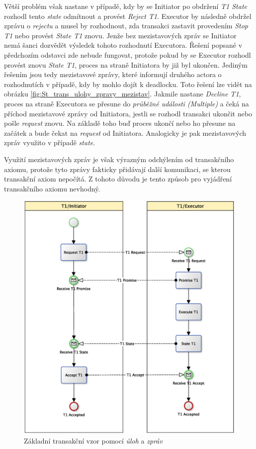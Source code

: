 Větší problém však nastane v případě, kdy by se Initiator po obdržení \textit{T1 State} rozhodl tento \textit{state} odmítnout a provést \textit{Reject T1}. Executor by následně obdržel zprávu o \textit{rejectu} a musel by rozhodnout, zda transakci zastavit provedením \textit{Stop T1} nebo provést \textit{State T1} znovu. Jenže bez mezistavových zpráv se Initiator nemá šanci dozvědět výsledek tohoto rozhodnutí Executora. Řešení popsané v předchozím odstavci zde nebude fungovat, protože pokud by se Executor rozhodl provést znovu \textit{State T1}, proces na straně Initiatora by již byl ukončen. Jediným řešením jsou tedy mezistavové zprávy, které informují druhého actora o rozhodnutích v případě, kdy by mohlo dojít k deadlocku. Toto řešení lze vidět na obrázku \ref{fig:St_trans_ulohy_zpravy_mezistav}. Jakmile nastane \textit{Decline T1}, proces na straně Executora se přesune do\textit{ průběžné události (Multiple)} a čeká na příchod mezistavové zprávy od Initiatora, jestli se rozhodl transakci ukončit nebo pošle \textit{request} znovu. Na základě toho buď proces ukončí nebo ho přesune na začátek a bude čekat na \textit{request} od Initiatora. Analogicky je pak mezistavových zpráv využito v případě \textit{state}.

Využití mezistavových zpráv je však výrazným odchýlením od transakčního axiomu, protože tyto zprávy fakticky přidávají další komunikaci, se kterou transakční axiom nepočítá. Z tohoto důvodu je tento způsob pro vyjádření transakčního axiomu nevhodný. 

\begin{figure}[htbp]
\centering
\includegraphics[width=\textwidth,height=\textheight,keepaspectratio]{obrazky/transaction-basic-messages}
\caption{Základní transakční vzor pomocí \textit{úloh} a \textit{zpráv}}
\label{fig:Zk_trans_ulohy_zpravy}
\end{figure}

